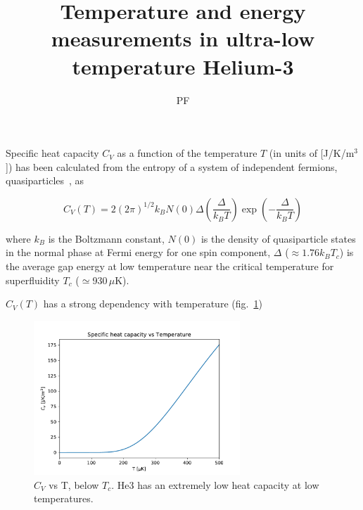 \documentclass[a4paper,10pt]{article}
\title{Temperature and energy measurements in ultra-low temperature Helium-3}
\author{PF}
\begin{document}
\maketitle



Specific heat capacity $C_V$ as a function of the temperature $T$ (in units of [J/K/m$^3$]) has been calculated from the entropy of a system of independent fermions, quasiparticles~\cite{vollhardt}, as

\begin{equation}
C_V(T)=2(2\pi)^{1/2}k_BN(0)\Delta\left(\frac{\Delta}{k_BT}\right)\exp\left(-\frac{\Delta}{k_BT}\right)
\end{equation}

where $k_B$ is the Boltzmann constant, $N(0)$ is the density of quasiparticle states in the normal phase at Fermi energy for one spin component, $\Delta$ ($\approx 1.76 k_B T_c$) is the average gap energy at low temperature near the critical temperature for superfluidity $T_c$ ($\simeq$930\,$\mu$K).

$C_V(T)$ has a strong dependency with temperature (fig.~\ref{fig:CvT})

\begin{figure}[htb]
  \begin{center}
    \includegraphics[width=0.69\textwidth]{Cv_vs_T-zoom}
  \end{center}
  \caption{$C_V$ vs T, below $T_c$. He3 has an extremely low heat capacity at low temperatures.}
  \label{fig:CvT}
\end{figure}
\end{document}

